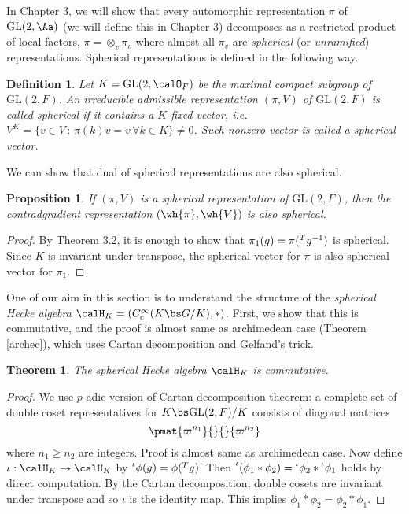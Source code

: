 \documentclass{article}
\newtheorem{theorem}{Theorem}[section]
\newtheorem{definition}{Definition}[section]
\newcommand{\pre}[1]{\prescript{#1}{}}
\newcommand{\GL}{\mathrm{GL}}
\newtheorem{proposition}{Proposition}[section]
\begin{document}
In Chapter 3, we will show that every automorphic representation $\pi$ of $\GL(2, \Aa)$ (we will define this in Chapter 3) decomposes as a restricted product of local factors, $\pi = \otimes_{v}\pi_v$ where almost all $\pi_v$ are \emph{spherical} (or \emph{unramified}) representations. 
Spherical representations is defined in the following way. 
\begin{definition}
Let $K = \GL(2, \calO_F)$ be the maximal compact subgroup of $\GL(2, F)$. 
An irreducible admissible representation $(\pi, V)$ of $\GL(2, F)$ is called spherical if it contains a $K$-fixed vector, i.e. $V^{K} = \{v\in V\,:\, \pi(k)v = v\,\forall k\in K\}\neq 0$. 
Such nonzero vector is called a spherical vector.  
\end{definition}
We can show that dual of spherical representations are also spherical. 
\begin{proposition}
If $(\pi, V)$ is a spherical representation of $\GL(2, F)$, then the contradgradient representation $(\wh{\pi}, \wh{V})$ is also spherical. 
\end{proposition}
\begin{proof}
By Theorem 3.2, it is enough to show that $\pi_{1}(g) = \pi(\pre{T}{g}^{-1})$ is spherical. Since $K$ is invariant under transpose, the spherical vector for $\pi$ is also spherical vector for $\pi_1$. 
\end{proof}
One of our aim in this section is to understand the structure of the \emph{spherical Hecke algebra} $\calH_{K} = (C_{c}^{\infty}(K\bs G / K), *)$. 
First, we show that this is commutative, and the proof is almost same as archimedean case (Theorem \ref{archec}), which uses Cartan decomposition and Gelfand's trick. 

\begin{theorem}
\label{nonarchsphcom}
The spherical Hecke algebra $\calH_K$ is commutative. 
\end{theorem}
\begin{proof}
We use $p$-adic version of Cartan decomposition theorem: a complete set of double coset representatives for $K\bs \GL(2, F)/K$ consists of diagonal matrices
$$
\pmat{\varpi^{n_1}}{}{}{\varpi^{n_2}}
$$
where $n_1 \geq n_2$ are integers. Proof is almost same as archimedean case. 
Now define $\iota:\calH_K\to \calH_K$ by $\pre{\iota}{\phi}(g) = \phi(\pre{T}{g})$. 
Then $\pre{\iota}{(\phi_1 * \phi_2)} = \pre{\iota}{\phi_2} * \pre{\iota}{\phi_1}$ holds by direct computation. 
By the Cartan decomposition, double cosets are invariant under transpose and so $\iota$ is the identity map. This implies $\phi_1 * \phi_2 = \phi_2 * \phi_1$. 
\end{proof}
\end{document}
